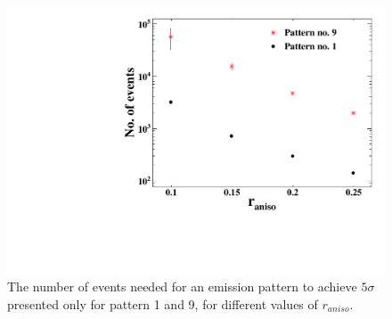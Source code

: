 \begin{figure}[h]
\centering
\includegraphics[width=0.45\linewidth]{ConvergenceVsRaniso.pdf}
\caption[Simulation of Number of events for discovery ]{The number of events needed for an emission pattern to achieve $5\sigma$ presented only for pattern 1 and 9, for different values of $r_{aniso}$.}
\label{fig:convergence}
\end{figure}